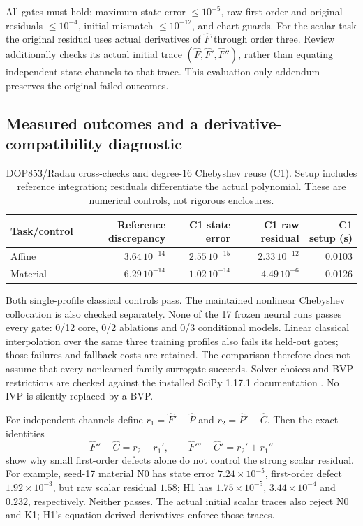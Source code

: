 All gates must hold: maximum state error $\le10^{-5}$, raw first-order
and original residuals $\le10^{-4}$, initial mismatch $\le10^{-12}$,
and chart guards. For the scalar task the original residual uses actual
derivatives of $\widehat F$ through order three. Review additionally
checks its actual initial trace $(\widehat F,\widehat F',\widehat F'')$,
rather than equating independent state channels to that trace. This
evaluation-only addendum preserves the original failed outcomes.

\subsection{Measured outcomes and a derivative-compatibility diagnostic}
\begin{table}[htbp]\centering\small
\begin{tabular}{@{}lrrrr@{}}\toprule
Task/control & Reference discrepancy & C1 state error & C1 raw residual & C1 setup (s) \\\midrule
Affine & $3.64\,10^{-14}$ & $2.55\,10^{-15}$ & $2.33\,10^{-12}$ & 0.0103 \\
Material & $6.29\,10^{-14}$ & $1.02\,10^{-14}$ & $4.49\,10^{-6}$ & 0.0126 \\\bottomrule
\end{tabular}
\caption{DOP853/Radau cross-checks and degree-16 Chebyshev reuse (C1).
Setup includes reference integration; residuals differentiate the actual
polynomial. These are numerical controls, not rigorous enclosures.}
\label{tab:autonomous-classical}
\end{table}

Both single-profile classical controls pass. The maintained nonlinear
Chebyshev collocation is also checked separately. None of the 17 frozen
neural runs passes every gate: 0/12 core, 0/2 ablations and 0/3 conditional
models. Linear classical interpolation over the same three training
profiles also fails its held-out gates; those failures and fallback costs
are retained. The comparison therefore does not assume that every
nonlearned family surrogate succeeds. Solver choices and BVP restrictions
are checked against the installed SciPy 1.17.1 documentation
\cite{scipy1171ivp,scipy1171bvp}. No IVP is silently replaced by a BVP.

For independent channels define
$r_1=\widehat F'-\widehat P$ and $r_2=\widehat P'-\widehat C$.
Then the exact identities
\begin{equation}\label{eq:autonomous-compatibility}
 \widehat F''-\widehat C=r_2+r_1',\qquad
 \widehat F'''-\widehat C'=r_2'+r_1''
\end{equation}
show why small first-order defects alone do not control the strong scalar
residual. For example, seed-17 material N0 has state error
$7.24\times10^{-5}$, first-order defect $1.92\times10^{-3}$, but raw
scalar residual $1.58$; H1 has $1.75\times10^{-5}$,
$3.44\times10^{-4}$ and $0.232$, respectively. Neither passes.
The actual initial scalar traces also reject N0 and K1; H1's
equation-derived derivatives enforce those traces.

